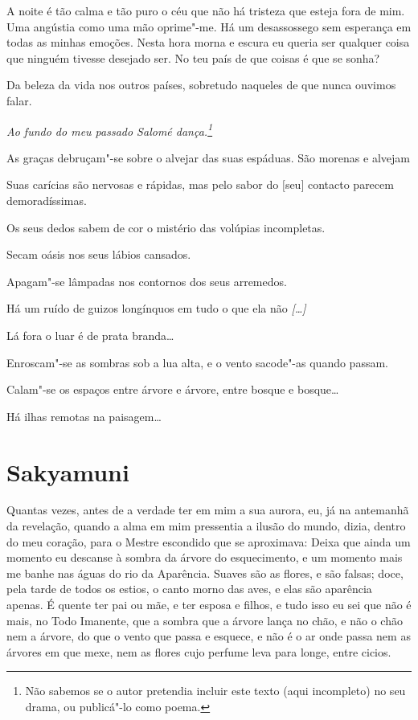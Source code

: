  A noite é tão calma e tão puro o céu que não há tristeza
que esteja fora de mim. Uma angústia como uma mão oprime"-me. Há um
desassossego sem esperança em todas as minhas emoções. Nesta hora
morna e escura eu queria ser qualquer coisa que ninguém tivesse
desejado ser. No teu país de que coisas é que se sonha?

Da beleza da vida nos outros países, sobretudo naqueles de que nunca
ouvimos falar.

\asterisc 

{\itshape
Ao fundo do meu passado Salomé dança.\footnote{ Não sabemos
se o autor pretendia incluir este texto (aqui incompleto) no seu
drama, ou publicá"-lo como poema.}

As graças debruçam"-se sobre o alvejar das suas espáduas. 
São morenas e alvejam 

Suas carícias são nervosas e rápidas, mas pelo sabor do $[$seu$]$
contacto parecem demoradíssimas.

Os seus dedos sabem de cor o mistério das volúpias incompletas.

Secam oásis nos seus lábios cansados. 

Apagam"-se lâmpadas nos contornos dos seus arremedos. 

Há um ruído de guizos longínquos em tudo o que ela não \emph{[\ldots{}]}

Lá fora o luar é de prata branda\ldots{} 

Enroscam"-se as sombras sob a lua alta, e o vento sacode"-as
quando passam. 

Calam"-se os espaços entre árvore e árvore, entre bosque e
bosque\ldots{} 

Há ilhas remotas na paisagem\ldots{} 
}

\endgroup

\chapter{Sakyamuni}

\begingroup
\linenumbers

 Quantas vezes, antes de a verdade ter em mim a sua aurora,
eu, já na antemanhã da revelação, quando a alma em mim pressentia a
ilusão do mundo, dizia, dentro do meu coração, para o Mestre
escondido que se aproximava: Deixa que ainda um momento eu descanse à
sombra da árvore do esquecimento, e um momento mais me banhe nas
águas do rio da Aparência. Suaves são as flores, e são falsas; doce,
pela tarde de todos os estios, o canto morno das aves, e elas são
aparência apenas. É quente ter pai ou mãe, e ter esposa e filhos, e
tudo isso eu sei que não é mais, no Todo Imanente, que a sombra que a
árvore lança no chão, e não o chão nem a árvore, do que o vento que
passa e esquece, e não é o ar onde passa nem as árvores em que mexe,
nem as flores cujo perfume leva para longe, entre cicios.

